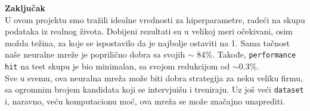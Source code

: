 \documentclass{article}
\providecommand{\inlinecode}[1]{\texttt{#1}}
\newenvironment{eComment}[2][Zaključak]
    { \begin{mdframed}[backgroundcolor=gray!40] \textbf{#1 #2} \\}
    {  \end{mdframed}}
\begin{document}
    \begin{eComment}{}
    U ovom projektu smo tražili idealne vrednosti za hiperparametre, radeći na skupu podataka iz realnog života. Dobijeni rezultati su u velikoj meri očekivani, osim možda težina, za koje se ispostavilo da je najbolje ostaviti na 1. Sama tačnost naše neuralne mreže je poprilično dobra sa svojih $\sim$  84\%. Takođe, \inlinecode{performance hit} na test skupu je bio minimalan, sa svojom redukcijom od $\sim$0.3\%. \\
    Sve u svemu, ova neuralna mreža može biti dobra strategija za neku veliku firmu, sa ogromnim brojem kandidata koji se intervjuišu i treniraju. Uz još veći \inlinecode{dataset} i, naravno, veću komputacionu moć, ova mreža se može značajno unaprediti.
    \end{eComment}
    
\end{document}
